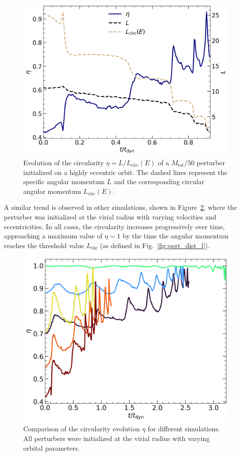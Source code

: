 \documentclass[twocolumn, a4paper]{article}
\begin{document}
\begin{figure}
    \centering
    \includegraphics[width=\columnwidth]{images/pert_l_circ.png}
    \caption{Evolution of the circularity \(\eta = L / L_\text{circ}(E)\) of a \(M_\text{tot} / 50\) perturber initialized on a highly eccentric orbit. The dashed lines represent the specific angular momentum \(L\) and the corresponding circular angular momentum \(L_\text{circ}(E)\).}
    \label{fig:pert_l_circ}
\end{figure}

A similar trend is observed in other simulations, shown in Figure~\ref{fig:pert_eta_comp}, where the perturber was initialized at the virial radius with varying velocities and eccentricities. In all cases, the circularity increases progressively over time, approaching a maximum value of \(\eta \sim 1\) by the time the angular momentum reaches the threshold value \(L_\text{thr}\) (as defined in Fig.~\ref{fig:pert_dist_l}).

\begin{figure}
    \centering
    \includegraphics[width=\columnwidth]{images/eta_comparison.png}
    \caption{Comparison of the circularity evolution \(\eta\) for different simulations. All perturbers were initialized at the virial radius with varying orbital parameters.}
    \label{fig:pert_eta_comp}
\end{figure}
\end{document}
